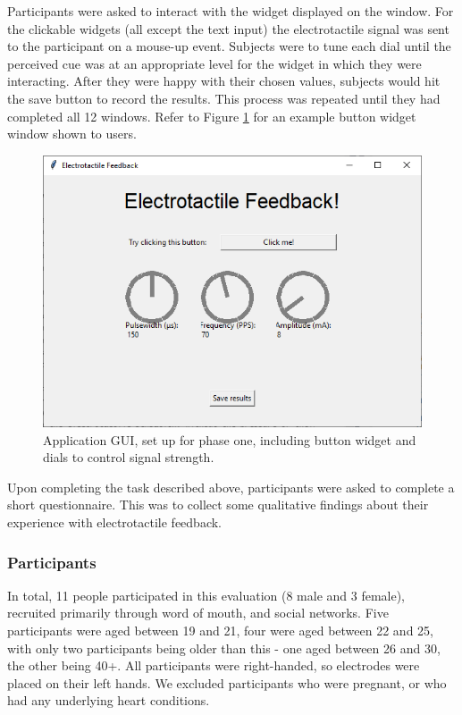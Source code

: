 \documentclass{mpaper}
\begin{document}
Participants were asked to interact with the widget displayed on the window. For the clickable widgets (all except the text input) the electrotactile signal was sent to the participant on a mouse-up event. Subjects were to tune each dial until the perceived cue was at an appropriate level for the widget in which they were interacting. After they were happy with their chosen values, subjects would hit the save button to record the results. This process was repeated until they had completed all 12 windows. Refer to Figure \ref{fig:tactile-application1} for an example button widget window shown to users.

\begin{figure}
    \centering
    \includegraphics[scale=0.35]{images/tactile_application.png}
    \caption{Application GUI, set up for phase one, including button widget and dials to control signal strength.}
    \label{fig:tactile-application1}
\end{figure}

Upon completing the task described above, participants were asked to complete a short questionnaire. This was to collect some qualitative findings about their experience with electrotactile feedback. 

\subsubsection{Participants} \label{subsec:participants-1}
In total, 11 people participated in this evaluation (8 male and 3 female), recruited primarily through word of mouth, and social networks. Five participants were aged between 19 and 21, four were aged between 22 and 25, with only two participants being older than this - one aged between 26 and 30, the other being 40+. All participants were right-handed, so electrodes were placed on their left hands. We excluded participants who were pregnant, or who had any underlying heart conditions.
\end{document}

